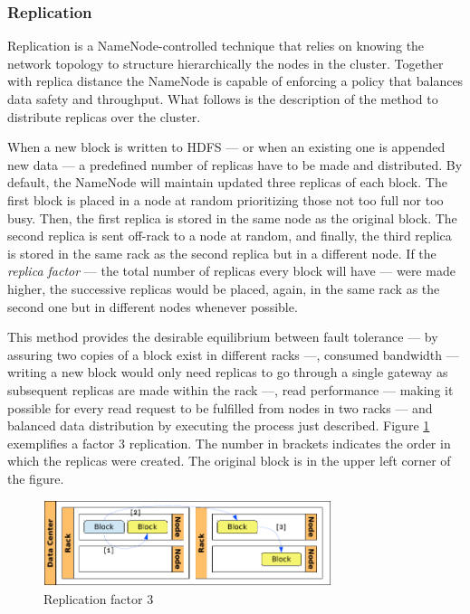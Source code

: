 \subsubsection{Replication}\label{subsubsec:replicacionbloques}
\noindent Replication is a NameNode-controlled technique that relies on knowing the network topology to structure hierarchically the nodes in the cluster. Together with replica distance the NameNode is capable of enforcing a policy that balances data safety and throughput. What follows is the description of the method to distribute replicas over the cluster.

When a new block is written to HDFS --- or when an existing one is appended new data --- a predefined number of replicas have to be made and distributed. By default, the NameNode will maintain updated three replicas of each block. The first block is placed in a node at random prioritizing those not too full nor too busy. Then, the first replica is stored in the same node as the original block. The second replica is sent off-rack to a node at random, and finally, the third replica is stored in the same rack as the second replica but in a different node. If the \emph{replica factor} --- the total number of replicas every block will have --- were made higher, the successive replicas would be placed, again, in the same rack as the second one but in different nodes whenever possible.

This method provides the desirable equilibrium between fault tolerance --- by assuring two copies of a block exist in different racks ---, consumed bandwidth --- writing a new block would only need replicas to go through a single gateway as subsequent replicas are made within the rack ---, read performance --- making it possible for every read request to be fulfilled from nodes in two racks --- and balanced data distribution by executing the process just described. Figure \ref{fig:repbloque} exemplifies a factor 3 replication. The number in brackets indicates the order in which the replicas were created. The original block is in the upper left corner of the figure.

\begin{figure}[tbp]
\begin{center}
\includegraphics[width=0.75\textwidth]{imagenes/019.pdf}
 \caption{Replication factor 3}
\label{fig:repbloque}
\end{center}
\end{figure}


